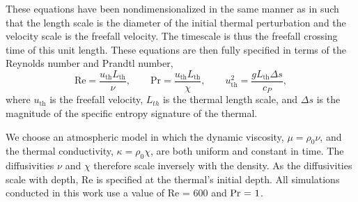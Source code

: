 \documentclass[twocolumn, amsmath, amsfonts, amssymb, trackchanges]{aastex62}
\begin{document}
These equations have been nondimensionalized in the same manner as in \citet{lecoanet&jeevanjee2018} such that the length scale is the diameter of the initial thermal perturbation and the velocity scale is the freefall velocity. 
The timescale is thus the freefall crossing time of this unit length. 
These equations are then fully specified in terms of the Reynolds number and Prandtl number,
\begin{equation}
\text{Re} = \frac{ u_{\text{th}} L_{\text{th}}}{\nu}, \qquad
\text{Pr} = \frac{ u_{\text{th}} L_{\text{th}}}{\chi}, \qquad
u_{\text{th}}^2 = \frac{g L_{\text{th}} \Delta s}{c_P},
\end{equation}
where $u_{\text{th}}$ is the freefall velocity, $L_{th}$ is the thermal length scale, and
$\Delta s$ is the magnitude of the specific entropy signature of the thermal.

We choose an atmospheric model in which the dynamic viscosity, $\mu = \rho_0 \nu$, and the thermal conductivity, $\kappa = \rho_0 \chi$, are both uniform and constant in time.
The diffusivities $\nu$ and $\chi$ therefore scale inversely with the density.
As the diffusivities scale with depth, Re is specified at the thermal's initial depth.
All simulations conducted in this work use a value of Re = 600 and $\mbox{\text{Pr} = 1}$.
\end{document}
